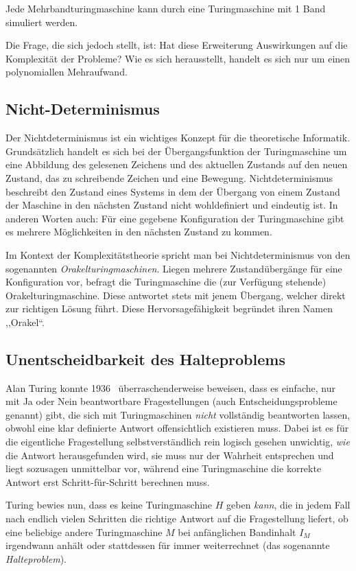 Jede Mehrbandturingmaschine kann durch eine Turingmaschine mit 1 Band simuliert werden.

Die Frage, die sich jedoch stellt, ist: Hat diese Erweiterung Auswirkungen auf die Komplexität der Probleme? Wie es sich herausstellt, handelt es sich nur um einen polynomiallen Mehraufwand.
%
\subsection{Nicht-Determinismus}
\label{sec:nondeterminism}
%
Der Nichtdeterminismus ist ein wichtiges Konzept für die theoretische Informatik. Grundsätzlich handelt es sich bei der Übergangsfunktion der Turingmaschine um eine Abbildung des gelesenen Zeichens und des aktuellen Zustands auf den neuen Zustand, das zu schreibende Zeichen und eine Bewegung. Nichtdeterminismus beschreibt den Zustand eines Systems in dem der Übergang von einem Zustand der Maschine in den nächsten Zustand nicht wohldefiniert und eindeutig ist. In anderen Worten auch: Für eine gegebene Konfiguration der Turingmaschine gibt es mehrere Möglichkeiten in den nächsten Zustand zu kommen.

Im Kontext der Komplexitätstheorie spricht man bei Nichtdeterminismus von den sogenannten \emph{Orakelturingmaschinen}. Liegen mehrere Zustandübergänge für eine Konfiguration vor, befragt die Turingmaschine die (zur Verfügung stehende) Orakelturingmaschine. Diese antwortet stets mit jenem Übergang, welcher direkt zur richtigen Lösung führt. Diese Hervorsagefähigkeit begründet ihren Namen ,,Orakel``.
%
\subsection{Unentscheidbarkeit des Halteproblems}
%
Alan Turing konnte 1936~\cite{Turing01011937} überraschenderweise beweisen, dass es einfache, nur mit Ja oder Nein beantwortbare Fragestellungen (auch Entscheidungsprobleme genannt) gibt, die sich mit Turingmaschinen \emph{nicht} vollständig beantworten lassen, obwohl eine klar definierte Antwort offensichtlich existieren muss. Dabei ist es für die eigentliche Fragestellung selbstverständlich rein logisch gesehen unwichtig, \emph{wie} die Antwort herausgefunden wird, sie muss nur der Wahrheit entsprechen und liegt sozusagen unmittelbar vor, während eine Turingmaschine die korrekte Antwort erst Schritt-für-Schritt berechnen muss.

Turing bewies nun, dass es keine Turingmaschine $H$ geben \emph{kann}, die in jedem Fall nach endlich vielen Schritten die richtige Antwort auf die Fragestellung liefert, ob eine beliebige andere Turingmaschine $M$ bei anfänglichen Bandinhalt $I_M$ irgendwann anhält oder stattdessen für immer weiterrechnet (das sogenannte \emph{Halteproblem}).

